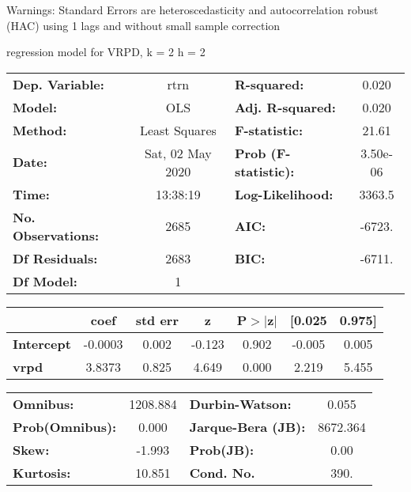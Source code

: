 Warnings: \newline
 [1] Standard Errors are heteroscedasticity and autocorrelation robust (HAC) using 1 lags and without small sample correction\ 

regression model for VRPD, k = 2 h = 2\begin{center}
\begin{tabular}{lclc}
\toprule
\textbf{Dep. Variable:}    &       rtrn       & \textbf{  R-squared:         } &     0.020   \\
\textbf{Model:}            &       OLS        & \textbf{  Adj. R-squared:    } &     0.020   \\
\textbf{Method:}           &  Least Squares   & \textbf{  F-statistic:       } &     21.61   \\
\textbf{Date:}             & Sat, 02 May 2020 & \textbf{  Prob (F-statistic):} &  3.50e-06   \\
\textbf{Time:}             &     13:38:19     & \textbf{  Log-Likelihood:    } &    3363.5   \\
\textbf{No. Observations:} &        2685      & \textbf{  AIC:               } &    -6723.   \\
\textbf{Df Residuals:}     &        2683      & \textbf{  BIC:               } &    -6711.   \\
\textbf{Df Model:}         &           1      & \textbf{                     } &             \\
\bottomrule
\end{tabular}
\begin{tabular}{lcccccc}
                   & \textbf{coef} & \textbf{std err} & \textbf{z} & \textbf{P$> |$z$|$} & \textbf{[0.025} & \textbf{0.975]}  \\
\midrule
\textbf{Intercept} &      -0.0003  &        0.002     &    -0.123  &         0.902        &       -0.005    &        0.005     \\
\textbf{vrpd}      &       3.8373  &        0.825     &     4.649  &         0.000        &        2.219    &        5.455     \\
\bottomrule
\end{tabular}
\begin{tabular}{lclc}
\textbf{Omnibus:}       & 1208.884 & \textbf{  Durbin-Watson:     } &    0.055  \\
\textbf{Prob(Omnibus):} &   0.000  & \textbf{  Jarque-Bera (JB):  } & 8672.364  \\
\textbf{Skew:}          &  -1.993  & \textbf{  Prob(JB):          } &     0.00  \\
\textbf{Kurtosis:}      &  10.851  & \textbf{  Cond. No.          } &     390.  \\
\bottomrule
\end{tabular}
\end{center}

